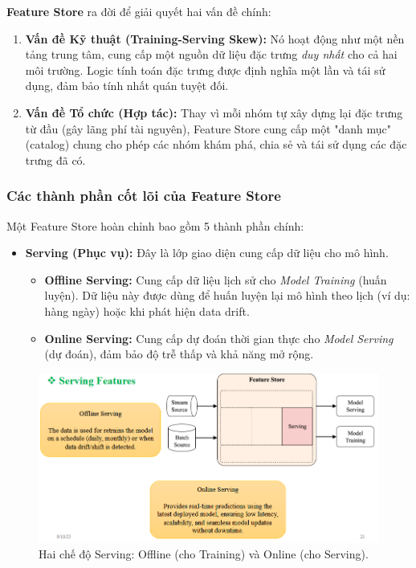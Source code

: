 \documentclass[11pt]{article}
\begin{document}
\textbf{Feature Store} ra đời để giải quyết hai vấn đề chính:
\begin{enumerate}
    \item \textbf{Vấn đề Kỹ thuật (Training-Serving Skew):} Nó hoạt động như một nền tảng trung tâm, cung cấp một nguồn dữ liệu đặc trưng \textit{duy nhất} cho cả hai môi trường. Logic tính toán đặc trưng được định nghĩa một lần và tái sử dụng, đảm bảo tính nhất quán tuyệt đối.
    \item \textbf{Vấn đề Tổ chức (Hợp tác):} Thay vì mỗi nhóm tự xây dựng lại đặc trưng từ đầu (gây lãng phí tài nguyên), Feature Store cung cấp một "danh mục" (catalog) chung cho phép các nhóm khám phá, chia sẻ và tái sử dụng các đặc trưng đã có.
\end{enumerate}

\subsubsection{Các thành phần cốt lõi của Feature Store}
Một Feature Store hoàn chỉnh bao gồm 5 thành phần chính:

\begin{itemize}
    \item \textbf{Serving (Phục vụ):} Đây là lớp giao diện cung cấp dữ liệu cho mô hình.
    \begin{itemize}
        \item \textbf{Offline Serving:} Cung cấp dữ liệu lịch sử cho \textit{Model Training} (huấn luyện). Dữ liệu này được dùng để huấn luyện lại mô hình theo lịch (ví dụ: hàng ngày) hoặc khi phát hiện data drift.
        \item \textbf{Online Serving:} Cung cấp dự đoán thời gian thực cho \textit{Model Serving} (dự đoán), đảm bảo độ trễ thấp và khả năng mở rộng.
    \end{itemize}
\end{itemize}
\begin{figure}[H]
    \centering
    \includegraphics[width=0.7\linewidth]{images/servingfeast.png}
    \caption{Hai chế độ Serving: Offline (cho Training) và Online (cho Serving).}
\end{figure}
\end{document}
